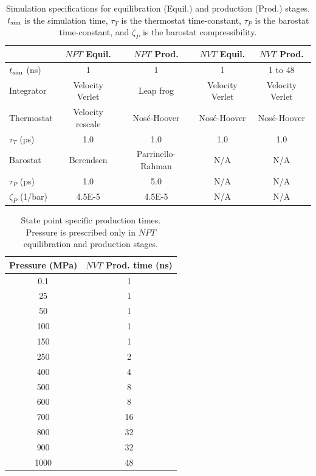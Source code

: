 \documentclass[preprint,review,12pt]{elsarticle}
\begin{document}
	\begin{table}[htbp!]
		\caption{Simulation specifications for equilibration (Equil.) and production (Prod.) stages. $t_{\rm sim}$ is the simulation time, $\tau_{T}$ is the thermostat time-constant, $\tau_{P}$ is the barostat time-constant, and $\zeta_{P}$ is the barostat compressibility.} \label{tab:thermostats_barostats}
		\begin{tabular}{|l|c|c|c|c|}
			\hline
			& $NPT$ Equil. & $NPT$ Prod. & $NVT$ Equil. & $NVT$ Prod. \\ \hline
			$t_{\rm sim}$ (ns) & 1 & 1 & 1 & 1 to 48 \\ \hline
			Integrator & Velocity Verlet \cite{Swope1982}  & Leap frog \cite{Hockney1974} & Velocity Verlet & Velocity Verlet \\ \hline 
			Thermostat & Velocity rescale \cite{Bussi2007} & Nos{\'e}-Hoover \cite{Hoover1985,Nose1984} & Nos{\'e}-Hoover & Nos{\'e}-Hoover \\ \hline 
			$\tau_{T}$ (ps) & 1.0 & 1.0 & 1.0 & 1.0 \\ \hline
			Barostat & Berendsen \cite{Berendsen1984} & Parrinello-Rahman \cite{Nose1983,Parrinello1981} & N/A & N/A \\ \hline
			$\tau_{P}$ (ps) & 1.0 & 5.0 & N/A & N/A \\ \hline
			$\zeta_{P}$ (1/bar) & 4.5E-5 & 4.5E-5 & N/A & N/A \\
			\hline
		\end{tabular}
	\end{table}

	\begin{table}[htb!]
		\caption{State point specific production times. Pressure is prescribed only in $NPT$ equilibration and production stages.} \label{tab:production times}
		\begin{center}
			\begin{tabular}{|c|c|}
				\hline
				Pressure (MPa) & $NVT$ Prod. time (ns) \\ \hline
				0.1 & 1 \\
				25 & 1 \\
				50 & 1 \\
				100 & 1 \\			     
				150 & 1 \\
				250 & 2 \\
				400 & 4 \\
				500 & 8 \\
				600 & 8 \\			     
				700 & 16 \\
				800 & 32 \\
				900 & 32 \\
				1000 & 48 \\
				\hline        
			\end{tabular}
		\end{center}
	\end{table}
	
\end{document}
